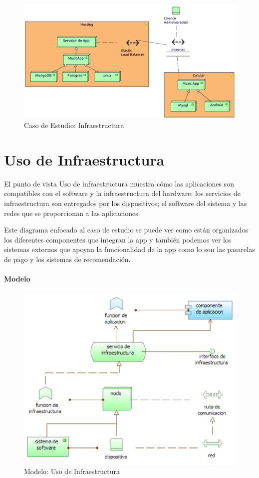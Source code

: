 \begin{figure}[h!]
	\centering
	\includegraphics[width=\linewidth]{Desarrollo/ArquitecturaEmpresarial/Tecnologia/imgs/insfraestructura.pdf}
	\caption{Caso de Estudio: Infraestructura}
\end{figure}

\newpage

\section{Uso de Infraestructura}
El punto de vista Uso de infraestructura muestra cómo las aplicaciones son compatibles con el software y la infraestructura del hardware: los servicios de infraestructura son entregados por los dispositivos; el software del sistema y las redes que se proporcionan a las aplicaciones.  \vspace{\baselineskip}

Este diagrama enfocado al caso de estudio se puede ver como están organizados los diferentes componentes que integran la app y también podemos ver los sistemas externos que apoyan la funcionalidad de la app como lo son las pasarelas de pago y los sistemas de recomendación.
\paragraph{Modelo}
\begin{figure}[h!]
	\centering
	\includegraphics[width=0.8\linewidth]{Desarrollo/ArquitecturaEmpresarial/Tecnologia/imgs/uso.PNG}
	\caption{Modelo: Uso de Infraestructura}
\end{figure}
\newpage
